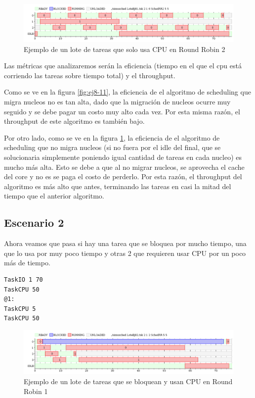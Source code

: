 \begin{figure}[H]
\caption{Ejemplo de un lote de tareas que solo usa CPU en Round Robin 2}
\label{fig:ej8-12}
\includegraphics[width=1\textwidth]{imgs/ej8-1rr2.png}
\end{figure}

Las métricas que analizaremos serán la eficiencia (tiempo en el que el cpu está corriendo las tareas sobre tiempo total) y el throughput.

Como se ve en la figura \ref{fig:ej8-11}, la eficiencia de el algoritmo de scheduling que migra nucleos no es tan alta, dado que la migración de nucleos ocurre muy seguido y se debe pagar un costo muy alto cada vez. Por esta misma razón, el throughput de este algoritmo es también bajo.

Por otro lado, como se ve en la figura \ref{fig:ej8-12}, la eficiencia de el algoritmo de scheduling que no migra nucleos (si no fuera por el idle del final, que se solucionaria simplemente poniendo igual cantidad de tareas en cada nucleo) es mucho más alta. Esto se debe a que al no migrar nucleos, se aprovecha el cache del core y no es se paga el costo de perderlo. Por esta razón, el throughput del algoritmo es más alto que antes, terminando las tareas en casi la mitad del tiempo que el anterior algoritmo.

\subsection{Escenario 2}

Ahora veamos que pasa si hay una tarea que se bloquea por mucho tiempo, una que lo usa por muy poco tiempo y otras 2 que requieren usar CPU por un poco más de tiempo.

\begin{lstlisting}
TaskIO 1 70
TaskCPU 50
@1:
TaskCPU 5
TaskCPU 50
\end{lstlisting}

\begin{figure}[H]
\caption{Ejemplo de un lote de tareas que se bloquean y usan CPU en Round Robin 1}
\label{fig:ej8-21}
\includegraphics[width=1\textwidth]{imgs/ej8-2rr.png}
\end{figure}

